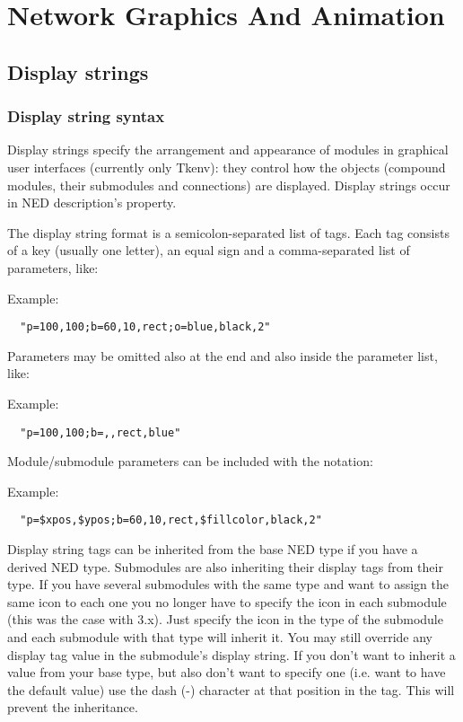 \chapter{Network Graphics And Animation}
\label{cha:graphics}

\section{Display strings}
\label{sec:ch-graphics:display-strings}

\subsection{Display string syntax}

Display strings specify the arrangement and
appearance of modules in graphical user interfaces (currently only
Tkenv): they control how the objects (compound modules, their
submodules and connections) are displayed. Display strings occur in
NED description's 
property.

The display string format is a semicolon-separated list of tags.
Each tag consists of a key (usually one letter), an equal sign
and a comma-separated list of parameters, like:

Example:
\begin{verbatim}
  "p=100,100;b=60,10,rect;o=blue,black,2"
\end{verbatim}

Parameters may be omitted also at the end and also inside the
parameter list, like:

Example:
\begin{verbatim}
  "p=100,100;b=,,rect,blue"
\end{verbatim}

Module/submodule parameters can be included with the  notation:

Example:
\begin{verbatim}
  "p=$xpos,$ypos;b=60,10,rect,$fillcolor,black,2"
\end{verbatim}

Display string tags can be inherited from the base NED type if you have a derived
NED type. Submodules are also inheriting their display tags from their type. If
you have several submodules with the same type and want to assign the same icon
to each one you no longer have to specify the icon in each submodule (this was the
case with {\opp} 3.x). Just specify the icon in the type of the submodule and each
submodule with that type will inherit it. You may still override any display tag
value in the submodule's display string. If you don't want to inherit a value
from your base type, but also don't want to specify one (i.e. want to have the
default value) use the dash (-) character at that position in the tag. This will
prevent the inheritance.

